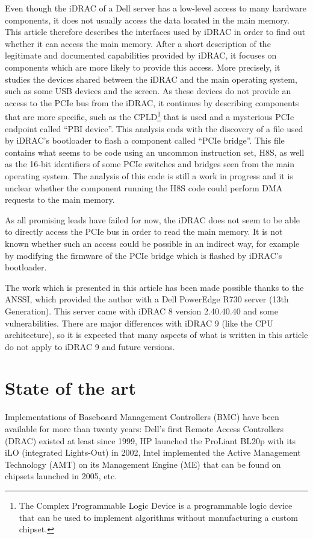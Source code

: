 Even though the iDRAC of a Dell server has a low-level access to many hardware components, it does not usually access the data located in the main memory.
This article therefore describes the interfaces used by iDRAC in order to find out whether it can access the main memory.
After a short description of the legitimate and documented capabilities provided by iDRAC, it focuses on components which are more likely to provide this access.
More precisely, it studies the devices shared between the iDRAC and the main operating system, such as some USB devices and the screen.
As these devices do not provide an access to the PCIe bus from the iDRAC, it continues by describing components that are more specific, such as the CPLD\footnote{The Complex Programmable Logic Device is a programmable logic device that can be used to implement algorithms without manufacturing a custom chipset.} that is used and a mysterious PCIe endpoint called ``PBI device''.
This analysis ends with the discovery of a file used by iDRAC's bootloader to flash a component called ``PCIe bridge''.
This file contains what seems to be code using an uncommon instruction set, H8S, as well as the 16-bit identifiers of some PCIe switches and bridges seen from the main operating system.
The analysis of this code is still a work in progress and it is unclear whether the component running the H8S code could perform DMA requests to the main memory.

As all promising leads have failed for now, the iDRAC does not seem to be able to directly access the PCIe bus in order to read the main memory.
It is not known whether such an access could be possible in an indirect way, for example by modifying the firmware of the PCIe bridge which is flashed by iDRAC's bootloader.

The work which is presented in this article has been made possible thanks to the ANSSI, which provided the author with a Dell PowerEdge R730 server (13th Generation).
This server came with iDRAC 8 version 2.40.40.40 and some vulnerabilities.
There are major differences with iDRAC 9 (like the CPU architecture), so it is expected that many aspects of what is written in this article do not apply to iDRAC 9 and future versions.

\section{State of the art}

Implementations of Baseboard Management Controllers (BMC) have been available for more than twenty years: Dell's first Remote Access Controllers (DRAC) existed at least since 1999, HP launched the ProLiant BL20p with its iLO (integrated Lights-Out) in 2002, Intel implemented the Active Management Technology (AMT) on its Management Engine (ME) that can be found on chipsets launched in 2005, etc.

